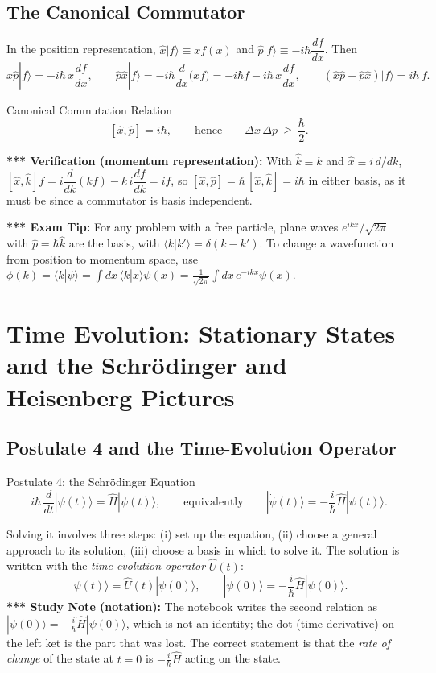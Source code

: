 \documentclass[11pt,a4paper]{article}
\begin{document}
\subsection{The Canonical Commutator}
In the position representation, $\hat x|f\rangle\equiv x f(x)$ and $\hat p|f\rangle\equiv-i\hbar\dfrac{df}{dx}$. Then
\[
\hat x\hat p|f\rangle=-i\hbar\,x\frac{df}{dx},\qquad
\hat p\hat x|f\rangle=-i\hbar\frac d{dx}\big(xf\big)=-i\hbar f-i\hbar\,x\frac{df}{dx},
\qquad
(\hat x\hat p-\hat p\hat x)|f\rangle=i\hbar\,f .
\]
\begin{thm}{Canonical Commutation Relation}
\[
[\hat x,\hat p]=i\hbar,\qquad\text{hence}\qquad\Delta x\,\Delta p\ \ge\ \frac\hbar2 .
\]
\end{thm}
\textbf{*** Verification (momentum representation):} With $\hat k\equiv k$ and $\hat x\equiv i\,d/dk$, $[\hat x,\hat k]f=i\dfrac d{dk}(kf)-k\,i\dfrac{df}{dk}=i f$, so $[\hat x,\hat p]=\hbar\,[\hat x,\hat k]=i\hbar$ in either basis, as it must be since a commutator is basis independent.

\textbf{*** Exam Tip:} For any problem with a free particle, plane waves $e^{ikx}/\sqrt{2\pi}$ with $\hat p=\hbar\hat k$ are the basis, with $\langle k|k'\rangle=\delta(k-k')$. To change a wavefunction from position to momentum space, use $\phi(k)=\langle k|\psi\rangle=\int dx\,\langle k|x\rangle\psi(x)=\frac1{\sqrt{2\pi}}\int dx\,e^{-ikx}\psi(x)$.
\section{Time Evolution: Stationary States and the Schr\"odinger and Heisenberg Pictures}
\label{fd:sec:time}

\subsection{Postulate 4 and the Time-Evolution Operator}
\begin{thm}{Postulate 4: the Schr\"odinger Equation}
\[
i\hbar\,\frac d{dt}|\psi(t)\rangle=\hat H|\psi(t)\rangle,\qquad\text{equivalently}\qquad |\dot\psi(t)\rangle=-\frac i\hbar\hat H|\psi(t)\rangle .
\]
\end{thm}
Solving it involves three steps: (i) set up the equation, (ii) choose a general approach to its solution, (iii) choose a basis in which to solve it. The solution is written with the \emph{time-evolution operator} $\hat U(t)$:
\[
|\psi(t)\rangle=\hat U(t)|\psi(0)\rangle,\qquad |\dot\psi(0)\rangle=-\frac i\hbar\hat H|\psi(0)\rangle .
\]
\textbf{*** Study Note (notation):} The notebook writes the second relation as $|\psi(0)\rangle=-\frac i\hbar\hat H|\psi(0)\rangle$, which is not an identity; the dot (time derivative) on the left ket is the part that was lost. The correct statement is that the \emph{rate of change} of the state at $t=0$ is $-\frac i\hbar\hat H$ acting on the state.
\end{document}
